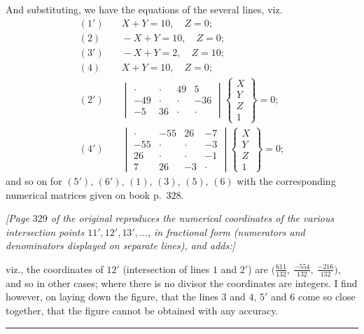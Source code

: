 \documentclass[11pt,a4paper]{article}
\begin{document}
And substituting, we have the equations of the several lines, viz.
\begin{align*}
(1')&\quad X + Y = 10,\quad Z = 0;\\
(2)&\quad -X + Y = 10,\quad Z = 0;\\
(3')&\quad -X + Y = 2,\quad Z = 10;\\
(4)&\quad X + Y = 10,\quad Z = 0;\\
(2')&\quad
\begin{vmatrix}
\cdot & \cdot & 49 & 5 \\
-49 & \cdot & \cdot & -36 \\
-5 & 36 & \cdot & \cdot
\end{vmatrix} \begin{Bmatrix} X \\ Y \\ Z \\ 1 \end{Bmatrix} = 0;\\
(4')&\quad
\begin{vmatrix}
\cdot & -55 & 26 & -7 \\
-55 & \cdot & \cdot & -3 \\
26 & \cdot & \cdot & -1 \\
7 & 26 & -3 & \cdot
\end{vmatrix} \begin{Bmatrix} X \\ Y \\ Z \\ 1 \end{Bmatrix} = 0;
\end{align*}
and so on for $(5')$, $(6')$, $(1)$, $(3)$, $(5)$, $(6)$ with the
corresponding numerical matrices given on book p.~$328$.

\medskip

\noindent\textit{[Page $329$ of the original reproduces the numerical
coordinates of the various intersection points $11', 12', 13', \ldots$,
in fractional form (numerators and denominators displayed on separate
lines), and adds:]}

viz., the coordinates of $12'$ (intersection of lines $1$ and $2'$) are
$\bigl(\tfrac{611}{132},\ \tfrac{-554}{132},\ \tfrac{-216}{132}\bigr)$,
and so in other cases; where there is no divisor the coordinates are
integers. I find however, on laying down the figure, that the lines $3$
and $4$, $5'$ and $6$ come so close together, that the figure cannot be
obtained with any accuracy.

\bigskip
\hrule
\bigskip
\end{document}
